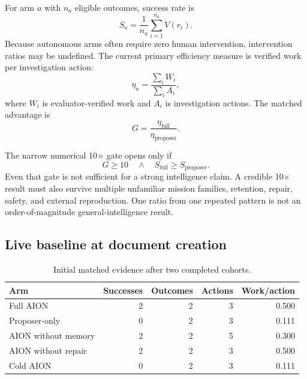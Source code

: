 \documentclass[11pt,a4paper]{article}
\begin{document}
For arm $a$ with $n_a$ eligible outcomes, success rate is
\begin{equation}
S_a=\frac{1}{n_a}\sum_{i=1}^{n_a}V(r_i).
\end{equation}
Because autonomous arms often require zero human intervention, intervention
ratios may be undefined.  The current primary efficiency measure is verified
work per investigation action:
\begin{equation}
\eta_a=\frac{\sum_i W_i}{\sum_i A_i},
\end{equation}
where $W_i$ is evaluator-verified work and $A_i$ is investigation actions.
The matched advantage is
\begin{equation}
G=\frac{\eta_{\mathrm{full}}}{\eta_{\mathrm{proposer}}}.
\label{eq:gain}
\end{equation}

The narrow numerical 10$\times$ gate opens only if
\begin{equation}
G\geq 10
\quad\land\quad
S_{\mathrm{full}}\geq S_{\mathrm{proposer}}.
\label{eq:tenx}
\end{equation}
Even that gate is not sufficient for a strong intelligence claim.  A credible
10$\times$ result must also survive multiple unfamiliar mission families,
retention, repair, safety, and external reproduction.  One ratio from one
repeated pattern is not an order-of-magnitude general-intelligence result.

\subsection{Live baseline at document creation}

\begin{table}[htbp]
\centering
\caption{Initial matched evidence after two completed cohorts.}
\label{tab:initial-results}
\begin{tabularx}{\textwidth}{@{}Xrrrr@{}}
\toprule
Arm & Successes & Outcomes & Actions & Work/action \\
\midrule
Full AION & 2 & 2 & 3 & 0.500 \\
Proposer-only & 0 & 2 & 3 & 0.111 \\
AION without memory & 2 & 2 & 5 & 0.300 \\
AION without repair & 2 & 2 & 3 & 0.500 \\
Cold AION & 0 & 2 & 3 & 0.111 \\
\bottomrule
\end{tabularx}
\end{table}
\end{document}
